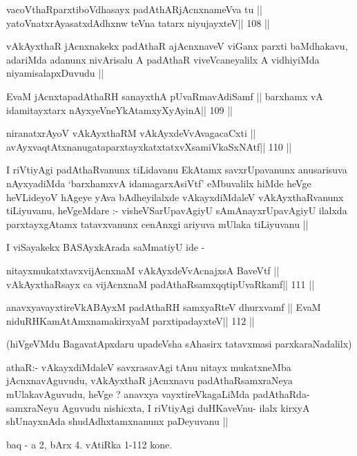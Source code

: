 \begin{shl}
vacoVthaRparxtiboVdhasayx padAthARjAcnxnameVva tu ||
yatoV\s natxrAyasatxdAdhxnw teVna tatarx niyujayxteV\hfill || 108 ||
\end{shl}

\begin{artha}
vAkAyxthaR jAcnxnakekx padAthaR ajAcnxnaveV viGanx parxti baMdhakavu,
adariMda adanunx nivArisalu A padAthaR viveVcaneyalilx A vidhiyiMda
niyamisalapxDuvudu ||
\end{artha}

\begin{shl}
EvaM jAcnxtapadAthaRH sanayxthA pUvaRmavAdiSamf ||
barxhamx vA idamitayxtarx nAyxyeVneYkAtamxyXyAyinA\hfill || 109 ||
\end{shl}

\begin{shl}
niranatxrAyoV vAkAyxthaRM vAkAyxdeVvAvagacaCxti ||
avAyxvaqtAtxnanugataparxtayxkatxtatxvXsamiVkaSxNAtf\hfill || 110 ||
\end{shl}

\begin{artha}
I riVtiyAgi padAthaRvanunx tiLidavanu EkAtamx savxrUpavanunx
anusarisuva nAyxyadiMda `barxhamxvA idamagarxAsiVtf' eMbuvalilx hiMde
heVge heVLideyoV hAgeye yAva bAdheyilalxde vAkayxdiMdaleV
vAkAyxthaRvanunx tiLiyuvanu, heVgeMdare :- visheVSarUpavAgiyU
sAmAnayxrUpavAgiyU ilalxda parxtayxgAtamx tatavxvanunx cenAnxgi
ariyuva mUlaka tiLiyuvanu ||
\end{artha}

\begin{artha}
I viSayakekx BASAyxkArada saMmatiyU ide -
\end{artha}

\begin{shl}
nitayxmukatxtavxvijAcnxnaM  \footnotemark[1]vAkAyxdeVvAcnajxsA BaveVtf ||
vAkAyxthaRsayx ca vijAcnxnaM padAthaRsamxqqtipUvaRkamf\hfill || 111 ||
\end{shl}

\begin{shl}
anavxyavayxtireVkABAyxM padAthaRH samxyaRteV dhurxvamf ||
EvaM niduRHKamAtAmxnamakirxyaM parxtipadayxteV\hfill || 112 ||
\end{shl}

\begin{artha}
(hiVgeVMdu BagavatApxdaru upadeVsha sAhasirx tatavxmasi
  parxkaraNadalilx) 
\end{artha}

\begin{artha}
athaR:- vAkayxdiMdaleV savxrasavAgi tAnu nitayx mukatxneMba
jAcnxnavAguvudu, vAkAyxthaR jAcnxnavu padAthaRsamxraNeya
mUlakavAguvudu, heVge ? anavxya vayxtireVkagaLiMda
padAthaRda-samxraNeyu Aguvudu nishicxta, I riVtiyAgi duHKaveVnu- ilalx
kirxyA shUnayxnAda shudAdhxtamxnanunx paDeyuvanu ||
\end{artha}


\begin{center}
baq - a 2, bArx 4. vAtiRka 1-112 kone.
\end{center}

